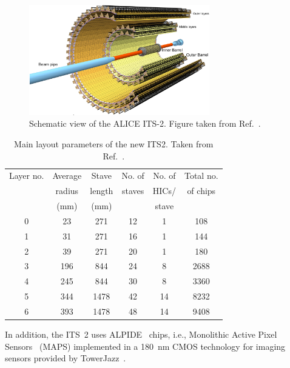 \begin{figure}
    \centering
    \includegraphics[width=0.7\textwidth]{Figures/Chapter 3/ITS_Scheme.png}
    \caption{Schematic view of the ALICE ITS-2. Figure taken from Ref.~\cite{ALICE:2023udb}.}
    \label{fig:ITS}
\end{figure}

\begin{table}[t]
    \centering
    \caption{Main layout parameters of the new ITS2. Taken from Ref.~\cite{ALICE:2023udb}.}
    \begin{tabular}{c|ccccc}
    \toprule
    Layer no. &	Average&	Stave&	No. of &No. of &Total no.\\
    &	radius&length&staves&HICs/	&of chips\\
    &	(mm)&(mm)& &stave	&\\
    
    \midrule
    0	&23 & 271 & 12 & 1&108\\
    1	&31 & 271 & 16	& 1&144\\
    2	&39 & 271 & 20	& 1&180\\
    3	&196 & 844 & 24 & 8	&2688\\
    4	&245 & 844 & 30 & 8	& 3360\\
    5	&344 & 1478	&42 & 14 &	8232\\
    6	&393 & 1478	& 48 & 14 &	9408\\
    
    \bottomrule
    \end{tabular}
    \label{tab:ITS2_params}
\end{table}

In addition, the ITS~2 uses ALPIDE~\cite{AglieriRinella:2017lym} chips, i.e., Monolithic Active Pixel Sensors~\cite{Snoeys:2014daa} (MAPS) implemented in a 180~nm CMOS technology for imaging sensors provided by TowerJazz~\cite{Senyukov:2013se}.

